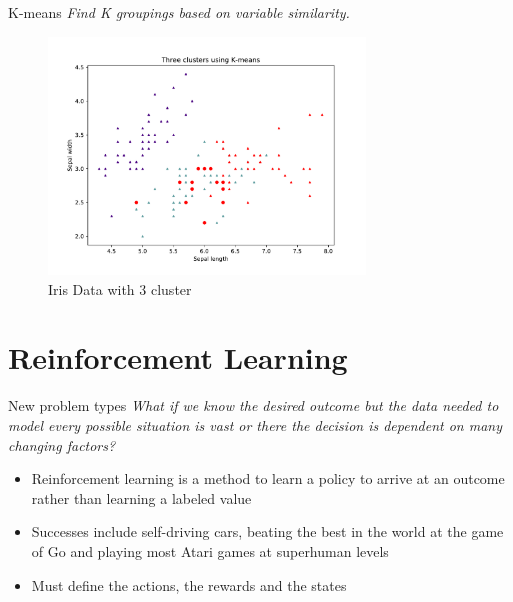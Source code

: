 \documentclass[10pt]{beamer}
\begin{document}
\begin{frame}{K-means}
\emph{Find K groupings based on variable similarity.}
		\begin{figure}
			\caption{Iris Data with 3 cluster}
			\includegraphics[width=0.75\textwidth, center, trim=0cm 0cm 0 0cm]{images/Iris_3means.pdf}
	\end{figure}
\end{frame}

\section{Reinforcement Learning}

\begin{frame}{New problem types}
\emph{What if we know the desired outcome but the data needed to model every possible situation is vast or there the decision is dependent on many changing factors?}
	\begin{itemize}
		\item Reinforcement learning is a method to learn a policy to arrive at an outcome rather than learning a labeled value
		\item Successes include self-driving cars, beating the best in the world at the game of Go and playing most Atari games at superhuman levels 
		\item Must define the actions, the rewards and the states
	\end{itemize}
\end{frame}
\end{document}

